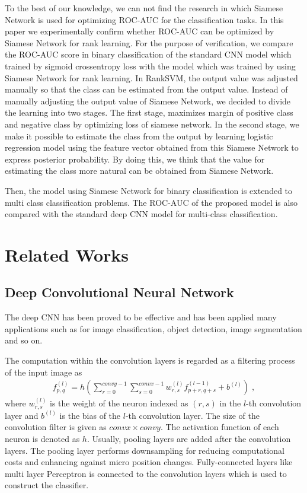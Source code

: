 \documentclass[twocolumn,10pt]{article}
\begin{document}
To the best of our knowledge, we can not find the research in which Siamese Network is used for optimizing ROC-AUC for the classification tasks.
In this paper we experimentally confirm whether ROC-AUC can be optimized by Siamese Network for rank learning.
For the purpose of verification, we compare the ROC-AUC score in binary classification of the standard CNN model which trained by sigmoid crossentropy loss with the model which was trained by using Siamese Network for rank learning.
In RankSVM, the output value was adjusted manually so that the class can be estimated from the output value.
Instead of manually adjusting the output value of Siamese Network, we decided to divide the learning into two stages.
The first stage, maximizes margin of positive class and negative class by optimizing loss of siamese network.
In the second stage, we make it possible to estimate the class from the output by learning logistic regression model using the feature vector obtained from this Siamese Network to express posterior probability.
By doing this, we think that the value for estimating the class more natural can be obtained from Siamese Network.

Then, the model using Siamese Network for binary classification is extended to multi class classification problems. The ROC-AUC of the proposed model is also compared with the standard deep CNN model for multi-class classification.

\section{Related Works}

\subsection{Deep Convolutional Neural Network}

The deep CNN has been proved to be effective and has been applied many applications such as for image classification\cite{Krizhevsky2012,He2016}, object detection\cite{He2017}, image segmentation\cite{Ronneberger2015} and so on.

The computation within the convolution layers is regarded as a filtering process of the input image as
\begin{align}
f_{p,q}^{(l)}=h(\sum^{convy-1}_{r=0}\sum^{convx-1}_{s=0}w^{(l)}_{r,s}f^{(l-1)}_{p+r, q+s}+b^{(l)}) \; ,
\end{align}
where $w^{(l)}_{r,s}$ is the weight of the neuron indexed as $(r,s)$ in the $l$-th convolution layer and $b^{(l)}$ is the bias of the $l$-th convolution layer. 
The size of the convolution filter is given as $convx \times convy$. The activation function of each neuron is denoted as $h$. 
Usually, pooling layers are added after the convolution layers. The pooling layer performs downsampling for reducing computational costs and enhancing against micro position changes. 
Fully-connected layers like multi layer Perceptron is connected to the convolution layers which is used to construct the classifier. 
\end{document}
